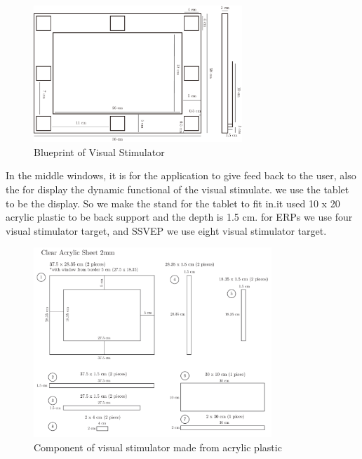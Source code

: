 \begin{figure}[ht]
	\centering
	\includegraphics[width=0.7\textwidth]{chapter6/blueprint.pdf}
	\caption{Blueprint of Visual Stimulator}
\end{figure}
In the middle windows, it is for the application to give feed back to the user, also the for display the dynamic functional of the visual stimulate. we use the tablet to be the display. So we make the stand for the tablet to fit in.it used 10 x 20 acrylic plastic to be back support and the depth is 1.5 cm. for ERPs we use four visual stimulator target, and SSVEP we use eight visual stimulator target. 



\begin{figure}[ht]
	\centering
	\includegraphics[width=0.8\textwidth]{chapter6/sch.pdf}
	\caption{Component of visual stimulator made from acrylic plastic}
	\label{fig:sch}
\end{figure}

